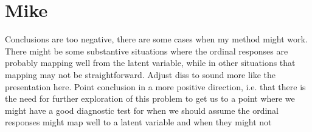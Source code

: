 \documentclass[12pt]{article}
\begin{document}
\section*{Mike}
	\begin{coi}
		\item Conclusions are too negative, there are some cases when my method might work. There might be some substantive situations where the ordinal responses are probably mapping well from the latent variable, while in other situations that mapping may not be straightforward. Adjust diss to sound more like the presentation here. Point conclusion in a more positive direction, i.e. that there is the need for further exploration of this problem to get us to a point where we might have a good diagnostic test for when we should assume the ordinal responses might map well to a latent variable and when they might not
	\end{coi}
\end{document}
